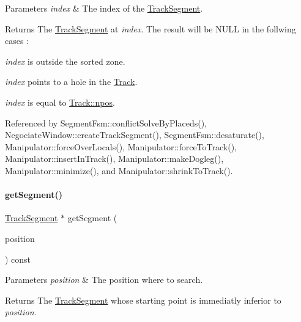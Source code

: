 \begin{DoxyParams}{Parameters}
{\em index} & The index of the \hyperlink{classKite_1_1TrackSegment}{Track\+Segment}. \\
\hline
\end{DoxyParams}
\begin{DoxyReturn}{Returns}
The \hyperlink{classKite_1_1TrackSegment}{Track\+Segment} at {\itshape index}. The result will be {\ttfamily N\+U\+LL} in the follwing cases \+:
\begin{DoxyItemize}
\item {\itshape index} is outside the sorted zone.
\item {\itshape index} points to a hole in the \hyperlink{classKite_1_1Track}{Track}.
\item {\itshape index} is equal to \hyperlink{classKite_1_1Track_ae0070ea45b2592ce3701ab9e486e58a0}{Track\+::npos}. 
\end{DoxyItemize}
\end{DoxyReturn}


Referenced by Segment\+Fsm\+::conflict\+Solve\+By\+Placeds(), Negociate\+Window\+::create\+Track\+Segment(), Segment\+Fsm\+::desaturate(), Manipulator\+::force\+Over\+Locals(), Manipulator\+::force\+To\+Track(), Manipulator\+::insert\+In\+Track(), Manipulator\+::make\+Dogleg(), Manipulator\+::minimize(), and Manipulator\+::shrink\+To\+Track().

\mbox{\label{classKite_1_1Track_a6962a27db7ae946217ea692983fc6a8c}} 
\paragraph{\texorpdfstring{get\+Segment()}{getSegment()}\hspace{0.1cm}{\footnotesize\ttfamily [2/2]}}
{\footnotesize\ttfamily \hyperlink{classKite_1_1TrackSegment}{Track\+Segment} $\ast$ get\+Segment (\begin{DoxyParamCaption}\item[{\textbf{ Db\+U\+::\+Unit}}]{position }\end{DoxyParamCaption}) const}


\begin{DoxyParams}{Parameters}
{\em position} & The position where to search. \\
\hline
\end{DoxyParams}
\begin{DoxyReturn}{Returns}
The \hyperlink{classKite_1_1TrackSegment}{Track\+Segment} whose starting point is immediatly inferior to {\itshape position}. 
\end{DoxyReturn}
\mbox{\label{classKite_1_1Track_af3db59591bef3c690ace92c114a4e4aa}} 
